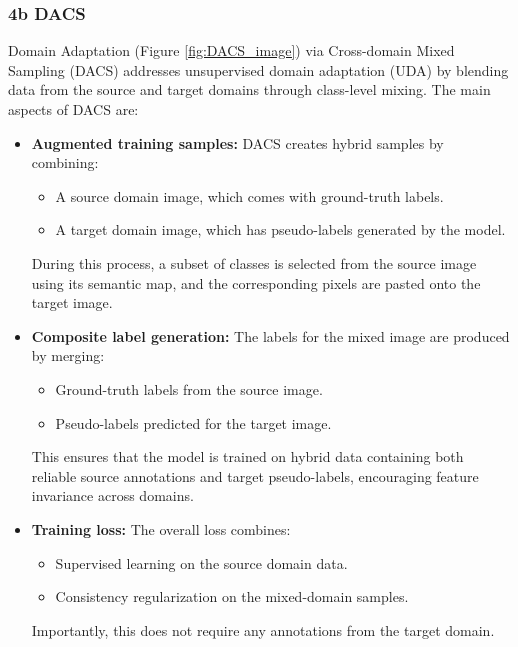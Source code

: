 \documentclass{article}
\begin{document}
\begin{multicols}{2}
	\subsubsection{4b DACS}
	
	Domain Adaptation (Figure \ref{fig:DACS_image}) via Cross-domain Mixed Sampling (DACS) \cite{tranheden2021dacs} addresses unsupervised domain adaptation (UDA) by blending data from the source and target domains through class-level mixing. The main aspects of DACS are:
	
	\begin{itemize}
		\item \textbf{Augmented training samples:} 
		DACS creates hybrid samples by combining:
		\begin{itemize}
			\item A source domain image, which comes with ground-truth labels.
			\item A target domain image, which has pseudo-labels generated by the model.
		\end{itemize}
		During this process, a subset of classes is selected from the source image using its semantic map, and the corresponding pixels are pasted onto the target image.
		
		\item \textbf{Composite label generation:}
		The labels for the mixed image are produced by merging:
		\begin{itemize}
			\item Ground-truth labels from the source image.
			\item Pseudo-labels predicted for the target image.
		\end{itemize}
		This ensures that the model is trained on hybrid data containing both reliable source annotations and target pseudo-labels, encouraging feature invariance across domains.
		

		\item \textbf{Training loss:} 
		The overall loss combines:
		\begin{itemize}
			\item Supervised learning on the source domain data.
			\item Consistency regularization on the mixed-domain samples.
		\end{itemize}
		Importantly, this does not require any annotations from the target domain.
		

	\end{itemize}


\end{multicols}
\end{document}
